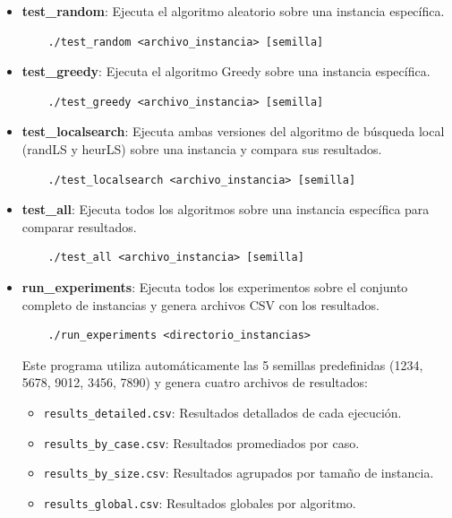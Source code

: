 \documentclass{article}
\begin{document}
\begin{itemize}
    \item \textbf{test\_random}: Ejecuta el algoritmo aleatorio sobre una instancia específica.
    \begin{verbatim}
    ./test_random <archivo_instancia> [semilla]
    \end{verbatim}
    
    \item \textbf{test\_greedy}: Ejecuta el algoritmo Greedy sobre una instancia específica.
    \begin{verbatim}
    ./test_greedy <archivo_instancia> [semilla]
    \end{verbatim}
    
    \item \textbf{test\_localsearch}: Ejecuta ambas versiones del algoritmo de búsqueda local (randLS y heurLS) sobre una instancia y compara sus resultados.
    \begin{verbatim}
    ./test_localsearch <archivo_instancia> [semilla]
    \end{verbatim}
    
    \item \textbf{test\_all}: Ejecuta todos los algoritmos sobre una instancia específica para comparar resultados.
    \begin{verbatim}
    ./test_all <archivo_instancia> [semilla]
    \end{verbatim}
    
    \item \textbf{run\_experiments}: Ejecuta todos los experimentos sobre el conjunto completo de instancias y genera archivos CSV con los resultados.
    \begin{verbatim}
    ./run_experiments <directorio_instancias>
    \end{verbatim}
    Este programa utiliza automáticamente las 5 semillas predefinidas (1234, 5678, 9012, 3456, 7890) y genera cuatro archivos de resultados:
    \begin{itemize}
        \item \texttt{results\_detailed.csv}: Resultados detallados de cada ejecución.
        \item \texttt{results\_by\_case.csv}: Resultados promediados por caso.
        \item \texttt{results\_by\_size.csv}: Resultados agrupados por tamaño de instancia.
        \item \texttt{results\_global.csv}: Resultados globales por algoritmo.
    \end{itemize}
\end{itemize}
\end{document}
